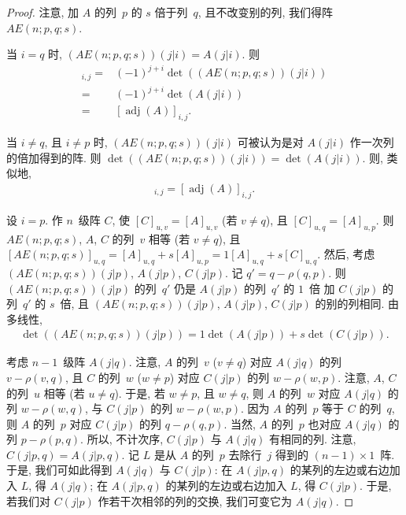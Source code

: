 \documentclass[../libro.tex]{subfiles}
\begin{document}
\begin{proof}
    注意, 加 \(A\) 的列~\(p\) 的 \(s\) 倍于列~\(q\),
    且不改变别的列, 我们得阵 \(A E(n; p, q; s)\).

    当 \(i = q\) 时,
    \((A E(n; p, q; s))(j|i) = A(j|i)\).
    则
    \begin{align*}
        [\operatorname{adj} {(A E(n; p, q; s))}]_{i,j}
        = {} &
        (-1)^{j+i} \det {((A E(n; p, q; s))(j|i))}
        \\
        = {} &
        (-1)^{j+i} \det {(A(j|i))}
        \\
        = {} &
        [\operatorname{adj} {(A)}]_{i,j}.
    \end{align*}

    当 \(i \neq q\), 且 \(i \neq p\) 时,
    \((A E(n; p, q; s))(j|i)\)
    可被认为是对 \(A(j|i)\) 作一次列的倍加得到的阵.
    则 \(\det {((A E(n; p, q; s))(j|i))} = \det {(A(j|i))}\).
    则, 类似地,
    \begin{align*}
        [\operatorname{adj} {(A E(n; p, q; s))}]_{i,j}
        = [\operatorname{adj} {(A)}]_{i,j}.
    \end{align*}

    设 \(i = p\).
    作 \(n\)~级阵 \(C\),
    使 \([C]_{u,v} = [A]_{u,v}\) (若 \(v \neq q\)),
    且 \([C]_{u,q} = [A]_{u,p}\).
    则 \(A E(n; p, q; s)\), \(A\), \(C\) 的列~\(v\) 相等
    (若 \(v \neq q\)),
    且 \([A E(n; p, q; s)]_{u,q}
        = [A]_{u,q} + s [A]_{u,p}
    = 1 [A]_{u,q} + s [C]_{u,q}\).
    然后, 考虑
    \((A E(n; p, q; s))(j|p)\),
    \(A(j|p)\), \(C(j|p)\).
    记 \(q' = q - \rho(q, p)\).
    则 \((A E(n; p, q; s))(j|p)\) 的列~\(q'\)
    仍是 \(A(j|p)\) 的列~\(q'\) 的 \(1\)~倍%
    加 \(C(j|p)\) 的列~\(q'\) 的 \(s\)~倍,
    且 \((A E(n; p, q; s))(j|p)\),
    \(A(j|p)\), \(C(j|p)\) 的别的列相同.
    由多线性,
    \begin{align*}
        \det {((A E(n; p, q; s))(j|p))}
        = 1 \det {(A(j|p))} + s \det {(C(j|p))}.
    \end{align*}

    考虑 \(n-1\)~级阵 \(A(j|q)\).
    注意, \(A\) 的列~\(v\) (\(v \neq q\)) 对应
    \(A(j|q)\) 的列 \(v - \rho(v, q)\),
    且 \(C\) 的列~\(w\) (\(w \neq p\)) 对应
    \(C(j|p)\) 的列 \(w - \rho(w, p)\).
    注意, \(A\), \(C\) 的列~\(u\) 相等
    (若 \(u \neq q\)).
    于是, 若 \(w \neq p\), 且 \(w \neq q\),
    则 \(A\) 的列~\(w\) 对应
    \(A(j|q)\) 的列 \(w - \rho(w, q)\),
    与 \(C(j|p)\) 的列 \(w - \rho(w, p)\).
    因为 \(A\) 的列~\(p\) 等于 \(C\) 的列~\(q\),
    则 \(A\) 的列~\(p\) 对应
    \(C(j|p)\) 的列 \(q - \rho(q, p)\).
    当然, \(A\) 的列~\(p\) 也对应
    \(A(j|q)\) 的列 \(p - \rho(p, q)\).
    所以, 不计次序,
    \(C(j|p)\) 与 \(A(j|q)\) 有相同的列.
    注意, \(C(j|{p,q}) = A(j|{p,q})\).
    记 \(L\) 是从 \(A\) 的列~\(p\) 去除行~\(j\)
    得到的 \((n - 1) \times 1\)~阵.
    于是, 我们可如此得到
    \(A(j|q)\) 与 \(C(j|p)\):
    在 \(A(j|{p,q})\) 的某列的左边或右边加入 \(L\),
    得 \(A(j|q)\);
    在 \(A(j|{p,q})\) 的某列的左边或右边加入 \(L\),
    得 \(C(j|p)\).
    于是, 若我们对 \(C(j|p)\) 作若干次相邻的列的交换,
    我们可变它为 \(A(j|q)\).


\end{proof}
\end{document}
